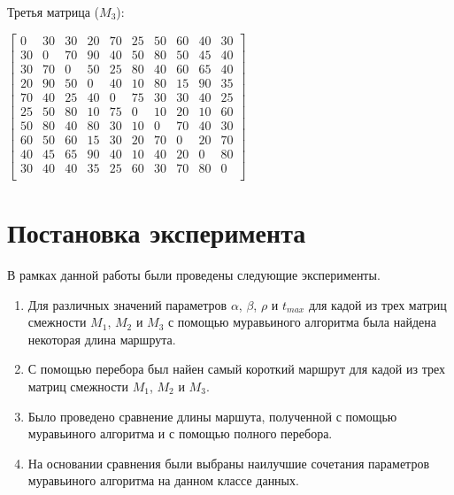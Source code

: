 \documentclass[a4paper,14pt]{report}
\begin{document}
Третья матрица ($M_{3}$):

$\begin{bmatrix}
0 & 30 & 30 & 20 & 70 & 25 & 50 & 60 & 40 & 30 \\
30 & 0 & 70 & 90 & 40 & 50 & 80 & 50 & 45 & 40 \\
30 & 70 & 0 & 50 & 25 & 80 & 40 & 60 & 65 & 40 \\
20 & 90 & 50 & 0 & 40 & 10 & 80 & 15 & 90 & 35 \\
70 & 40 & 25 & 40 & 0 & 75 & 30 & 30 & 40 & 25 \\
25 & 50 & 80 & 10 & 75 & 0 & 10 & 20 & 10 & 60 \\
50 & 80 & 40 & 80 & 30 & 10 & 0 & 70 & 40 & 30 \\
60 & 50 & 60 & 15 & 30 & 20 & 70 & 0 & 20 & 70 \\
40 & 45 & 65 & 90 & 40 & 10 & 40 & 20 & 0 & 80 \\
30 & 40 & 40 & 35 & 25 & 60 & 30 & 70 & 80 & 0 \\
\end{bmatrix}$

\section*{Постановка эксперимента}

В рамках данной работы были проведены следующие эксперименты.

\begin{enumerate}
	\item Для различных значений параметров $\alpha$, $\beta$, $\rho$ и $t_{max}$ для кадой из трех матриц смежности $M_{1}$, $M_{2}$ и $M_{3}$ с помощью муравьиного алгоритма была найдена некоторая длина маршрута.
 	\item С помощью перебора был найен самый короткий маршрут для кадой из трех матриц смежности $M_{1}$, $M_{2}$ и $M_{3}$.
	\item Было проведено сравнение длины маршута, полученной с помощью муравьиного алгоритма и с помощью полного перебора.
	\item На основании сравнения были выбраны наилучшие сочетания параметров муравьиного алгоритма на данном классе данных.
\end{enumerate}
\end{document}
